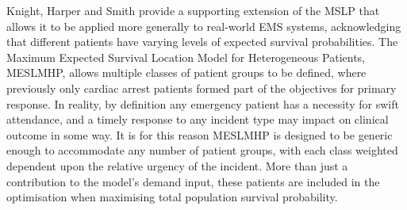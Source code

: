 \documentclass[preprint,12pt]{elsarticle}
\begin{document}
Knight, Harper and Smith \cite{Knight2012918} provide a supporting extension of
the MSLP that allows it to be applied more generally to real-world EMS systems,
acknowledging that different patients have varying levels of expected survival
probabilities.  The Maximum Expected Survival Location Model for Heterogeneous
Patients, MESLMHP, allows multiple classes of patient groups to be defined,
where previously only cardiac arrest patients formed part of the objectives for
primary response.  In reality, by definition any emergency patient has a
necessity for swift attendance, and a timely response to any incident type may
impact on clinical outcome in some way. It is for this reason MESLMHP is
designed to be generic enough to accommodate any number of patient groups, with
each class weighted dependent upon the relative urgency of the incident.  More
than just a contribution to the model’s demand input, these patients are
included in the optimisation when maximising total population survival
probability.


\end{document}
